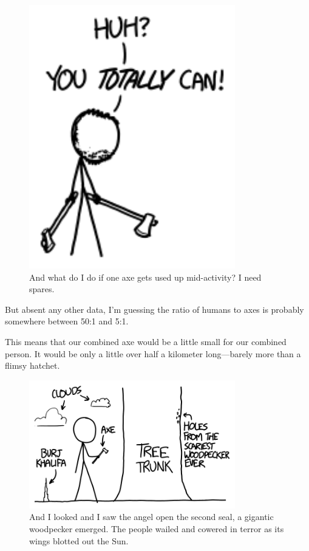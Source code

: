 {\begin{figure}[!htbp]
\centering
\includegraphics[scale=0.5, max width=0.8\textwidth]{imgs/a/90/ygg_ask2.png}
\caption{And what do I do if one axe gets used up mid-activity? I need spares.}
\end{figure}

{But absent any other data, I'm guessing the ratio of humans to axes is probably somewhere between 50:1 and 5:1.}

{This means that our combined axe would be a little small for our combined person. It would be only a little over half a kilometer long—barely more than a flimsy hatchet.}

\begin{figure}[!htbp]
\centering
\includegraphics[scale=0.5, max width=0.8\textwidth]{imgs/a/90/ygg_axe.png}
\caption{And I looked and I saw the angel open the second seal, a gigantic woodpecker emerged. The people wailed and cowered in terror as its wings blotted out the Sun.}
\end{figure}

}
